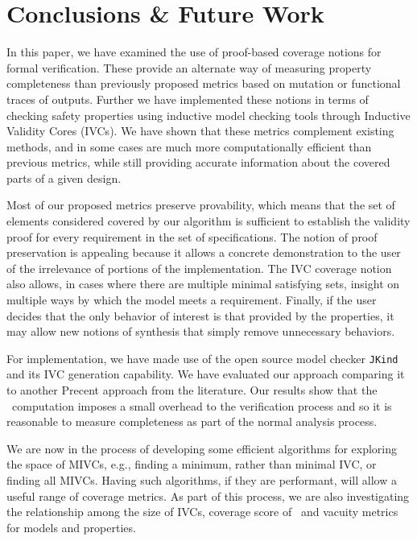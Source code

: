 \section{Conclusions \& Future Work}
\label{sec:conclusion}

In this paper, we have examined the use of proof-based coverage notions for formal verification.  These provide an alternate way of measuring property completeness than previously proposed metrics based on mutation or functional traces of outputs.
Further we have implemented these notions in terms of checking safety properties using inductive model checking tools through Inductive Validity Cores (IVCs).  We have shown that these metrics complement existing methods, and in some cases are much more computationally efficient than previous metrics, while still providing accurate information about the covered parts of a given design.

Most of our proposed metrics preserve provability, which means that the set of elements considered covered by our algorithm is sufficient to establish the validity proof for every requirement in the set of specifications.  The notion of proof preservation is appealing because it allows a concrete demonstration to the user of the irrelevance of portions of the implementation.  The IVC coverage notion also allows, in cases where there are multiple minimal satisfying sets, insight on multiple ways by which the model meets a requirement.
Finally, if the user decides that the only behavior of interest is that provided by the properties, it may allow new notions of synthesis that simply remove unnecessary behaviors.

For implementation, we have made use of the open source model checker \texttt{JKind} and its IVC generation capability. We have evaluated our approach comparing it to another Precent approach from the literature.  Our results show that the \ivccov\ computation imposes a small overhead to the verification process and so it is reasonable to measure completeness as part of the normal analysis process.

We are now in the process of developing some efficient algorithms for exploring the space of MIVCs, e.g., finding a minimum, rather than minimal IVC, or finding all MIVCs.  Having such algorithms, if they are performant, will allow a useful range of coverage metrics.  As part of this process, we are also investigating the relationship among the size of IVCs, coverage score of \ivccov\, and vacuity metrics for models and properties.

